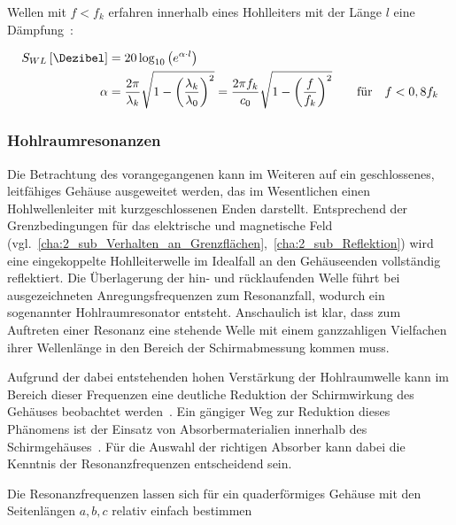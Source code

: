 \par
\vspace{\linespace}
Wellen mit $f < f_k$ erfahren innerhalb eines Hohlleiters mit der Länge $l$ eine Dämpfung~\cite{EM_Schirmung}:

\begin{align}
    S_{WL} \left[\si{\Dezibel}\right] &= 20\log_{10}\left(e^{\alpha\cdot l}\right)  \\
    \alpha &= \frac{2\pi}{\lambda_k} \sqrt{1-\left(\frac{\lambda_k}{\lambda_0}\right)^2} = \frac{2\pi f_k}{c_0} \sqrt{1-\left(\frac{f}{f_k}\right)^2} \qquad \text{für} \quad f < 0,8 f_k
\end{align}




\subsubsection{Hohlraumresonanzen}\label{cha:2_subsub_Hohlraumresonanzen}

Die Betrachtung des vorangegangenen \Abschnitts{} kann im Weiteren auf ein geschlossenes, leitfähiges Gehäuse ausgeweitet werden, das im Wesentlichen einen Hohlwellenleiter mit kurzgeschlossenen Enden darstellt. Entsprechend der Grenzbedingungen für das elektrische und magnetische Feld (vgl.~\Abschnitte\ref{cha:2_sub_Verhalten_an_Grenzflächen},~\ref{cha:2_sub_Reflektion}) wird eine eingekoppelte Hohlleiterwelle im Idealfall an den Gehäuseenden vollständig reflektiert. Die Überlagerung der hin- und rücklaufenden Welle führt bei ausgezeichneten Anregungsfrequenzen zum Resonanzfall, wodurch ein sogenannter Hohlraumresonator entsteht. Anschaulich ist klar, dass zum Auftreten einer Resonanz eine stehende Welle mit einem ganzzahligen Vielfachen ihrer Wellenlänge in den Bereich der Schirmabmessung kommen muss.
\par
\vspace{\linespace}
Aufgrund der dabei entstehenden hohen Verstärkung der Hohlraumwelle kann im Bereich dieser Frequenzen eine deutliche Reduktion der Schirmwirkung des Gehäuses beobachtet werden~\cite{EM_Schirmung}. Ein gängiger Weg zur Reduktion dieses Phänomens ist der Einsatz von Absorbermaterialien innerhalb des Schirmgehäuses~\cite{EM_Schirmung}. Für die Auswahl der richtigen Absorber kann dabei die Kenntnis der Resonanzfrequenzen entscheidend sein. 
\par
\vspace{\linespace}
Die Resonanzfrequenzen lassen sich für ein quaderförmiges Gehäuse mit den Seitenlängen $a, b, c$ relativ einfach bestimmen~\cite{Klassische_Elektrodynamik}

